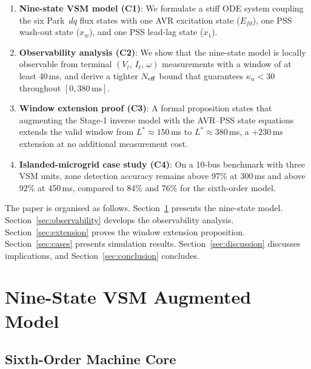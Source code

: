 \documentclass[journal]{IEEEtran}
\newcommand{\kappan}{\kappa_{n}}
\newcommand{\Neff}{N_{\rm eff}}
\newcommand{\Lstar}{L^*}
\newcommand{\Efd}{E_{fd}}
\newcommand{\Vt}{V_t}
\begin{document}
\begin{enumerate}
  \item \textbf{Nine-state VSM model (C1)}: We formulate a
        stiff ODE system coupling the six Park~$dq$ flux states
        with one AVR excitation state ($\Efd$), one PSS wash-out
        state ($x_w$), and one PSS lead-lag state ($x_1$).

  \item \textbf{Observability analysis (C2)}: We show that the
        nine-state model is locally observable from terminal
        $(\Vt,\,I_t,\,\omega)$ measurements with a window of
        at least 40\,ms, and derive a tighter $\Neff$ bound
        that guarantees $\kappan < 30$ throughout $[0, 380\,\text{ms}]$.

  \item \textbf{Window extension proof (C3)}: A formal proposition
        states that augmenting the Stage-1 inverse model with the
        AVR--PSS state equations extends the valid window from
        $\Lstar \approx 150$\,ms to $\Lstar \approx 380$\,ms,
        a $+230$\,ms extension at no additional measurement cost.

  \item \textbf{Islanded-microgrid case study (C4)}: On a 10-bus
        benchmark with three VSM units, zone detection accuracy
        remains above 97\% at 300\,ms and above 92\% at 450\,ms,
        compared to 84\% and 76\% for the sixth-order model.
\end{enumerate}

The paper is organised as follows.
Section~\ref{sec:vsm_model} presents the nine-state model.
Section~\ref{sec:observability} develops the observability analysis.
Section~\ref{sec:extension} proves the window extension proposition.
Section~\ref{sec:cases} presents simulation results.
Section~\ref{sec:discussion} discusses implications, and
Section~\ref{sec:conclusion} concludes.

\section{Nine-State VSM Augmented Model}
\label{sec:vsm_model}

\subsection{Sixth-Order Machine Core}
\end{document}
